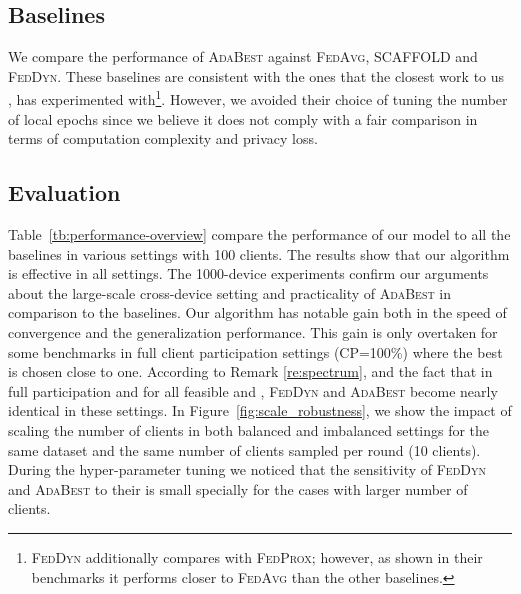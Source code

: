 \documentclass[runningheads]{llncs}
\def\figref#1{Figure~\ref{#1}}
\def\tableref#1{Table~\ref{#1}}
\newcommand{\fedavg}{\textsc{FedAvg}\xspace}
\newcommand{\scaffold}{\textsc{SCAFFOLD}\xspace}
\newcommand{\fedprox}{\textsc{FedProx}\xspace}
\newcommand{\feddyn}{\textsc{FedDyn}\xspace}
\newcommand{\ours}{\textsc{AdaBest}\xspace}
\begin{document}
\subsection{Baselines}
We compare the performance of \ours against \fedavg \cite{mcmahan2017communication}, \scaffold \cite{karimireddy2020scaffold} and \feddyn \cite{acar2021federated}. These baselines are consistent with the ones that the closest work to us \cite{acar2021federated}, has experimented with\footnote{\feddyn additionally compares with \fedprox \cite{li2020federated}; however, as shown in their benchmarks it performs closer to \fedavg than the other baselines.}. However, we avoided their choice of tuning the number of local epochs since we believe it does not comply with a fair comparison in terms of computation complexity and privacy loss. 


\subsection{Evaluation}
\tableref{tb:performance-overview} compare the performance of our model to all the baselines in various settings with 100 clients. The results show that our algorithm is effective in all settings. The 1000-device experiments confirm our arguments about the large-scale cross-device setting and practicality of \ours in comparison to the baselines. Our algorithm has notable gain both in the speed of convergence and the generalization performance. This gain is only overtaken for some benchmarks in full client participation settings (CP=100\%) where the best  is chosen close to one. According to Remark \ref{re:spectrum}, and the fact that in full participation  and  for all feasible  and , \feddyn and \ours become nearly identical in these settings. In \figref{fig:scale_robustness}, we show the impact of scaling the number of clients in both balanced and imbalanced settings for the same dataset and the same number of clients sampled per round (10 clients). During the hyper-parameter tuning we noticed that the sensitivity of \feddyn and \ours to their  is small specially for the cases with larger number of clients. 
\end{document}
